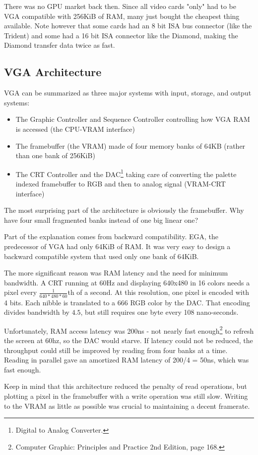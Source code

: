 \documentclass[book.tex]{subfiles}
\begin{document}
 There was no GPU market back then. Since all video cards "only" had to be VGA compatible with 256KiB of RAM, many just bought the cheapest thing available. Note however that some cards had an 8 bit ISA bus connector (like the Trident) and some had a 16 bit ISA connector like the Diamond, making the Diamond transfer data twice as fast.\\
\par




\subsection{VGA Architecture}

VGA can be summarized as three major systems with input, storage, and output systems:
\begin{itemize}
\item The Graphic Controller and Sequence Controller controlling how VGA RAM is accessed (the CPU-VRAM interface)
\item The framebuffer (the VRAM) made of four memory banks of 64KB (rather than one bank of 256KiB)
\item The CRT Controller and the DAC\footnote{Digital to Analog Converter.} taking care of converting the palette indexed framebuffer to RGB and then to analog signal (VRAM-CRT interface)
\end{itemize}

The most surprising part of the architecture is obviously the framebuffer. Why have four small fragmented banks instead of one big linear one?\\
\par
Part of the explanation comes from backward compatibility. EGA, the predecessor of VGA had only 64KiB of RAM. It was very easy to design a backward compatible system that used only one bank of 64KiB.\\
\par
The more significant reason was RAM latency and the need for minimum bandwidth. A CRT running at 60Hz and displaying 640x480 in 16 colors needs a pixel every $\frac{1}{640*480*60}$th of a second. At this resolution, one pixel is encoded with 4 bits. Each nibble is translated to a 666 RGB color by the DAC. That encoding divides bandwidth by $4.5$, but still requires one byte every 108 nano-seconds.\\
\par
 Unfortunately, RAM access latency was 200ns - not nearly fast enough\footnote{Computer Graphic: Principles and Practice 2nd Edition, page 168.} to refresh the screen at 60hz, so the DAC would starve. If latency could not be reduced, the throughput could still be improved by reading from four banks at a time. Reading in parallel gave an amortized RAM latency of 200/4 = 50ns, which was fast enough.\\
\par
Keep in mind that this architecture reduced the penalty of read operations, but plotting a pixel in the framebuffer with a write operation was still slow. Writing to the VRAM as little as possible was crucial to maintaining a decent framerate. 
\end{document}
